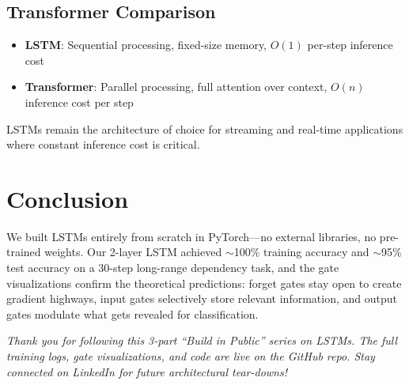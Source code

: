 \documentclass[12pt]{article}
\begin{document}
\subsection*{Transformer Comparison}
\begin{itemize}
    \item \textbf{LSTM}: Sequential processing, fixed-size memory, $O(1)$ per-step inference cost
    \item \textbf{Transformer}: Parallel processing, full attention over context, $O(n)$ inference cost per step
\end{itemize}

LSTMs remain the architecture of choice for streaming and real-time applications where constant inference cost is critical.

\section*{Conclusion}

We built LSTMs entirely from scratch in PyTorch---no external libraries, no pre-trained weights. Our 2-layer LSTM achieved $\sim$100\% training accuracy and $\sim$95\% test accuracy on a 30-step long-range dependency task, and the gate visualizations confirm the theoretical predictions: forget gates stay open to create gradient highways, input gates selectively store relevant information, and output gates modulate what gets revealed for classification.

\vspace{1em}
\noindent \textit{Thank you for following this 3-part ``Build in Public'' series on LSTMs. The full training logs, gate visualizations, and code are live on the GitHub repo. Stay connected on LinkedIn for future architectural tear-downs!}
\end{document}
